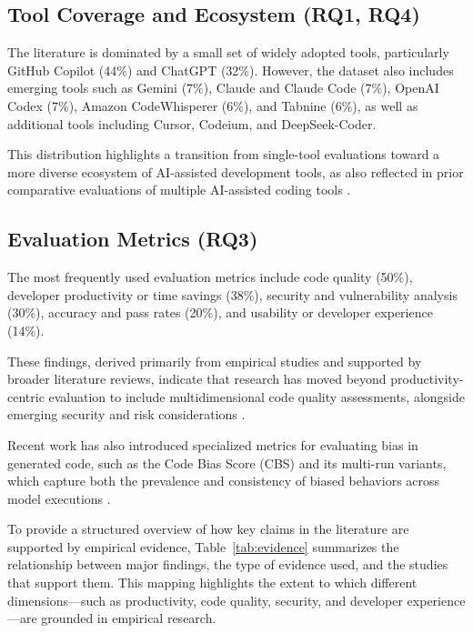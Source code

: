 \documentclass[conference]{IEEEtran}
\begin{document}
\subsection{Tool Coverage and Ecosystem (RQ1, RQ4)}

The literature is dominated by a small set of widely adopted tools, particularly GitHub Copilot (44\%) and ChatGPT (32\%). However, the dataset also includes emerging tools such as Gemini (7\%), Claude and Claude Code (7\%), OpenAI Codex (7\%), Amazon CodeWhisperer (6\%), and Tabnine (6\%), as well as additional tools including Cursor, Codeium, and DeepSeek-Coder.

This distribution highlights a transition from single-tool evaluations toward a more diverse ecosystem of AI-assisted development tools, as also reflected in prior comparative evaluations of multiple AI-assisted coding tools \cite{yetistiren2023evaluation}.

\subsection{Evaluation Metrics (RQ3)}

The most frequently used evaluation metrics include code quality (50\%), developer productivity or time savings (38\%), security and vulnerability analysis (30\%), accuracy and pass rates (20\%), and usability or developer experience (14\%).

These findings, derived primarily from empirical studies and supported by broader literature reviews, indicate that research has moved beyond productivity-centric evaluation to include multidimensional code quality assessments, alongside emerging security and risk considerations \cite{yetistiren2023evaluation, pearce2022security}.

Recent work has also introduced specialized metrics for evaluating bias in generated code, such as the Code Bias Score (CBS) and its multi-run variants, which capture both the prevalence and consistency of biased behaviors across model executions \cite{huang2025bias}.

To provide a structured overview of how key claims in the literature are supported by empirical evidence, Table~\ref{tab:evidence} summarizes the relationship between major findings, the type of evidence used, and the studies that support them. This mapping highlights the extent to which different dimensions—such as productivity, code quality, security, and developer experience—are grounded in empirical research.
\end{document}
